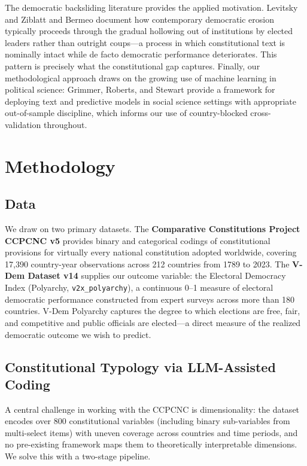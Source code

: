 \documentclass[9pt,twoside]{pnas-new}
\begin{document}
The democratic backsliding literature provides the applied motivation. Levitsky and Ziblatt \cite{levitsky_ziblatt_2018} and Bermeo \cite{bermeo_2016} document how contemporary democratic erosion typically proceeds through the gradual hollowing out of institutions by elected leaders rather than outright coups---a process in which constitutional text is nominally intact while de facto democratic performance deteriorates. This pattern is precisely what the constitutional gap captures. Finally, our methodological approach draws on the growing use of machine learning in political science: Grimmer, Roberts, and Stewart \cite{grimmer_roberts_stewart_2022} provide a framework for deploying text and predictive models in social science settings with appropriate out-of-sample discipline, which informs our use of country-blocked cross-validation throughout.

\section*{Methodology}

\subsection*{Data}

We draw on two primary datasets. The \textbf{Comparative Constitutions Project CCPCNC v5} \cite{elkins_ginsburg_melton_ccpc} provides binary and categorical codings of constitutional provisions for virtually every national constitution adopted worldwide, covering 17,390 country-year observations across 212 countries from 1789 to 2023. The \textbf{V-Dem Dataset v14} \cite{placeholder_vdem} supplies our outcome variable: the Electoral Democracy Index (Polyarchy, \texttt{v2x\_polyarchy}), a continuous 0--1 measure of electoral democratic performance constructed from expert surveys across more than 180 countries. V-Dem Polyarchy captures the degree to which elections are free, fair, and competitive and public officials are elected---a direct measure of the realized democratic outcome we wish to predict.

\subsection*{Constitutional Typology via LLM-Assisted Coding}

A central challenge in working with the CCPCNC is dimensionality: the dataset encodes over 800 constitutional variables (including binary sub-variables from multi-select items) with uneven coverage across countries and time periods, and no pre-existing framework maps them to theoretically interpretable dimensions. We solve this with a two-stage pipeline.
\end{document}
